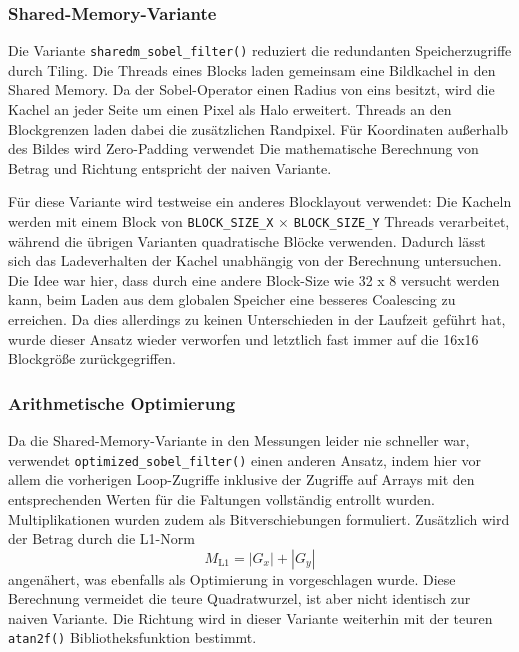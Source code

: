 \subsubsection{Shared-Memory-Variante}
\label{sec:shared_memory_sobel}

Die Variante \texttt{sharedm\_sobel\_filter()} reduziert die redundanten
Speicherzugriffe durch Tiling. Die Threads eines Blocks laden gemeinsam
eine Bildkachel in den Shared Memory. Da der Sobel-Operator einen Radius von
eins besitzt, wird die Kachel an jeder Seite um einen Pixel als Halo erweitert.
Threads an den Blockgrenzen laden dabei die zusätzlichen Randpixel. Für
Koordinaten außerhalb des Bildes wird Zero-Padding verwendet Die mathematische Berechnung von Betrag und
Richtung entspricht der naiven Variante.

Für diese Variante wird testweise ein anderes Blocklayout verwendet: Die Kacheln werden
mit einem Block von \texttt{BLOCK\_SIZE\_X} $\times$ \texttt{BLOCK\_SIZE\_Y}
Threads verarbeitet, während die übrigen Varianten quadratische Blöcke
verwenden. Dadurch lässt sich das Ladeverhalten der Kachel unabhängig von der
Berechnung untersuchen. Die Idee war hier, dass durch eine andere Block-Size wie 32 x 8 versucht werden kann, beim Laden aus dem globalen Speicher eine besseres Coalescing zu erreichen. Da dies allerdings zu keinen Unterschieden in der Laufzeit geführt hat, wurde dieser Ansatz wieder verworfen und letztlich fast immer auf die 16x16 Blockgröße zurückgegriffen.

\subsubsection{Arithmetische Optimierung}

Da die Shared-Memory-Variante in den Messungen leider nie schneller war,
verwendet \texttt{optimized\_sobel\_filter()} einen anderen Ansatz, indem hier vor allem die vorherigen Loop-Zugriffe inklusive der Zugriffe auf Arrays mit den entsprechenden Werten für die Faltungen vollständig entrollt wurden. Multiplikationen wurden zudem als
Bitverschiebungen formuliert. Zusätzlich wird der Betrag durch die L1-Norm
\begin{equation}
    M_{\mathrm{L1}} = |G_x| + |G_y|
\end{equation}
angenähert, was ebenfalls als Optimierung in \cite{gonzalez_digital_2018} vorgeschlagen wurde. Diese Berechnung vermeidet die teure Quadratwurzel, ist aber nicht
identisch zur naiven Variante. Die Richtung
wird in dieser Variante weiterhin mit der teuren \texttt{atan2f()} Bibliotheksfunktion bestimmt.

